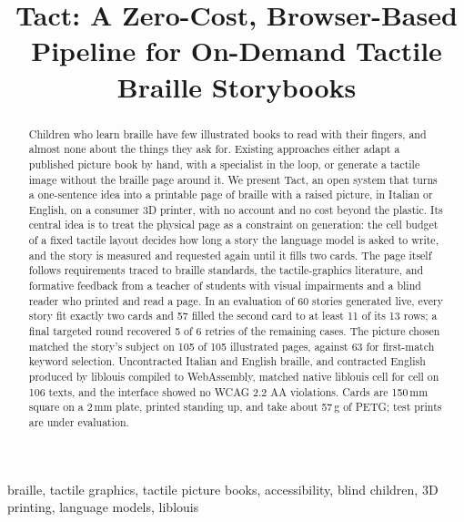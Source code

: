 \documentclass[conference]{IEEEtran}
\begin{document}
\title{Tact: A Zero-Cost, Browser-Based Pipeline for On-Demand Tactile Braille Storybooks}

\author{
}

\maketitle

\begin{abstract}
Children who learn braille have few illustrated books to read with their fingers, and almost none about the things they ask for. Existing approaches either adapt a published picture book by hand, with a specialist in the loop, or generate a tactile image without the braille page around it. We present Tact, an open system that turns a one-sentence idea into a printable page of braille with a raised picture, in Italian or English, on a consumer 3D printer, with no account and no cost beyond the plastic. Its central idea is to treat the physical page as a constraint on generation: the cell budget of a fixed tactile layout decides how long a story the language model is asked to write, and the story is measured and requested again until it fills two cards. The page itself follows requirements traced to braille standards, the tactile-graphics literature, and formative feedback from a teacher of students with visual impairments and a blind reader who printed and read a page. In an evaluation of 60 stories generated live, every story fit exactly two cards and 57 filled the second card to at least 11 of its 13 rows; a final targeted round recovered 5 of 6 retries of the remaining cases. The picture chosen matched the story's subject on 105 of 105 illustrated pages, against 63 for first-match keyword selection. Uncontracted Italian and English braille, and contracted English produced by liblouis compiled to WebAssembly, matched native liblouis cell for cell on 106 texts, and the interface showed no WCAG 2.2 AA violations. Cards are 150\,mm square on a 2\,mm plate, printed standing up, and take about 57\,g of PETG; test prints are under evaluation.
\end{abstract}

\begin{IEEEkeywords}
braille, tactile graphics, tactile picture books, accessibility, blind children, 3D printing, language models, liblouis
\end{IEEEkeywords}
\end{document}

